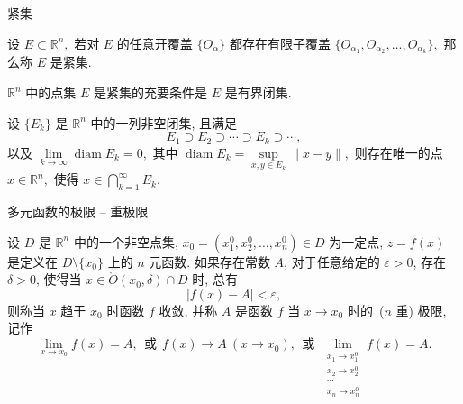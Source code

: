 \begin{frame}{紧集}

\begin{Def}[紧集]
设 $E \subset \mathbb{R}^n,$ 若对 $E$ 的任意开覆盖 $\{O_\alpha\}$ 都存在有限子覆盖 $\{O_{\alpha_1}, O_{\alpha_2}, \dots, O_{\alpha_k}\},$ 那么称 $E$ 是紧集.
\end{Def}

\pause

\begin{thm}
$\mathbb{R}^n$ 中的点集 $E$ 是紧集的充要条件是 $E$ 是有界闭集.
\end{thm}

\pause

\begin{thm}
设 $\{ E_k \}$ 是 $\mathbb{R}^n$ 中的一列非空闭集, 且满足
\[E_1 \supset E_2 \supset \cdots \supset E_k \supset \cdots,\]
以及 $\lim\limits_{k\to\infty} \operatorname{diam} E_k = 0,$ 其中 $\operatorname{diam} E_k = \sup\limits_{x, y \in E_k} \lVert x - y \rVert,$ 则存在唯一的点 $x \in \mathbb{R}^n,$ 使得 $x \in \bigcap\limits_{k=1}^{\infty} E_k.$
\end{thm}

\end{frame}


\begin{frame}{多元函数的极限 -- 重极限}

\begin{Def}[重极限]
设 $D$ 是 $\mathbb{R}^n$ 中的一个非空点集, $x_0 = (x_1^0, x_2^0, \ldots, x_n^0) \in D$ 为一定点, $z = f(x)$ 是定义在 $D \setminus \{x_0\}$ 上的 $n$ 元函数. 如果存在常数 $A$, 对于任意给定的 $\varepsilon > 0$, 存在 $\delta > 0$, 使得当 $x \in \mathring{O}(x_0, \delta) \cap D$ 时, 总有
\[\lvert f(x) - A \rvert < \varepsilon,\]
则称当 $x$ 趋于 $x_0$ 时函数 $f$ 收敛, 并称 $A$ 是函数 $f$ 当 $x \to x_0$ 时的~{\color{red}($n$ 重) 极限}, 记作
\[\lim_{x \to x_0} f(x) = A, ~~ \text{或} ~~ f(x) \to A ~ (x \to x_0), ~~ \text{或} ~~ \lim_{\substack{x_1 \to x_1^0 \\ x_2 \to x_2^0 \\ \cdots \\ x_n \to x_n^0}} f(x) = A.\]
\end{Def}

\end{frame}


